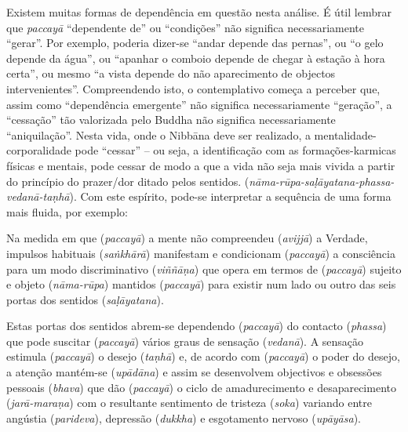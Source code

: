 Existem muitas formas de dependência em questão nesta análise. É útil lembrar
que \emph{paccayā} ``dependente de'' ou ``condições'' não significa
necessariamente ``gerar''. Por exemplo, poderia dizer-se ``andar depende das
pernas'', ou ``o gelo depende da água'', ou ``apanhar o comboio depende de
chegar à estação à hora certa'', ou mesmo ``a vista depende do não aparecimento
de objectos intervenientes''. Compreendendo isto, o contemplativo começa a
perceber que, assim como ``dependência emergente'' não significa necessariamente
``geração'', a ``cessação'' tão valorizada pelo Buddha não significa
necessariamente ``aniquilação''. Nesta vida, onde o Nibbāna deve ser
realizado, a mentalidade-corporalidade pode ``cessar'' -- ou seja, a
identificação com as formações-karmicas físicas e mentais, pode cessar de
modo a que a vida não seja mais vivida a partir do princípio do prazer/dor
ditado pelos sentidos. (\emph{nāma-rūpa-saḷāyatana-phassa-vedanā-taṇhā}). Com
este espírito, pode-se interpretar a sequência de uma forma mais fluida, por
exemplo:

Na medida em que (\emph{paccayā}) a mente não compreendeu (\emph{avijjā}) a
Verdade, impulsos habituais (\emph{saṅkhārā}) manifestam e condicionam
(\emph{paccayā}) a consciência para um modo discriminativo (\emph{viññāṇa}) que
opera em termos de (\emph{paccayā}) sujeito e objeto (\emph{nāma-rūpa}) mantidos
(\emph{paccayā}) para existir num lado ou outro das seis portas dos sentidos
(\emph{saḷāyatana}).


Estas portas dos sentidos abrem-se dependendo (\emph{paccayā}) do contacto
(\emph{phassa}) que pode suscitar (\emph{paccayā}) vários graus de sensação
(\emph{vedanā}). A sensação estimula (\emph{paccayā}) o desejo (\emph{taṇhā}) e,
de acordo com (\emph{paccayā}) o poder do desejo, a atenção mantém-se
(\emph{upādāna}) e assim se desenvolvem objectivos e obsessões pessoais
(\emph{bhava}) que dão (\emph{paccayā}) o ciclo de amadurecimento e
desaparecimento (\emph{jarā-maraṇa}) com o resultante sentimento de tristeza
(\emph{soka}) variando entre angústia (\emph{parideva}), depressão
(\emph{dukkha}) e esgotamento nervoso (\emph{upāyāsa}).

